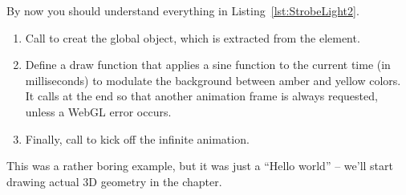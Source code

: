 By now you should understand everything in Listing~\ref{lst:StrobeLight2}.  

\begin{enumerate}
\item Call  to creat the global  object, which is extracted from the  element.
\item Define a draw function that applies a sine function to the current time (in milliseconds) to modulate the background between amber and yellow colors.  It calls  at the end so that another animation frame is always requested, unless a WebGL error occurs.
\item Finally, call  to kick off the infinite animation.
\end{enumerate}

This was a rather boring example, but it was just a ``Hello world'' -- we'll start drawing actual 3D geometry in the chapter.
